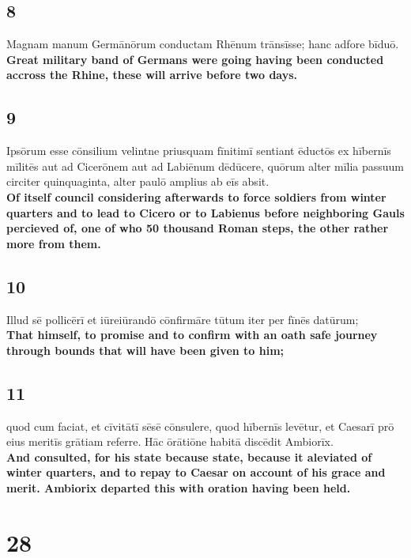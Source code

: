 \documentclass{article}
\begin{document}
\subsection*{8}
Magnam manum Germānōrum conductam Rhēnum trānsīsse; hanc adfore bīduō.\\
\textbf{Great military band of Germans were going having been conducted accross the Rhine, these will arrive before two days.}

\subsection*{9}
Ipsōrum esse cōnsilium velintne priusquam fīnitimī sentiant ēductōs ex hībernīs mīlitēs aut ad Cicerōnem aut ad Labiēnum dēdūcere, quōrum alter mīlia passuum circiter quinquaginta, alter paulō amplius ab eīs absit.\\
\textbf{ Of itself council considering afterwards to force soldiers from winter quarters and to lead to Cicero or to Labienus before neighboring Gauls percieved of, one of who 50 thousand Roman steps, the other rather more from them. }

\subsection*{10}
Illud sē pollicērī et iūreiūrandō cōnfirmāre tūtum iter per fīnēs datūrum;\\
\textbf{That himself, to promise and to confirm with an oath safe journey through bounds that will have been given to him;}

\subsection*{11}
quod cum faciat, et cīvitātī sēsē cōnsulere, quod hībernīs levētur, et Caesarī prō eius meritīs grātiam referre. Hāc ōrātiōne habitā discēdit Ambiorīx.\\
\textbf{And consulted, for his state because state, because it aleviated of winter quarters, and to repay to Caesar on account of his grace and merit. Ambiorix departed this with oration having been held.}


\section*{28}
\end{document}
